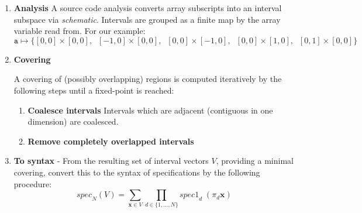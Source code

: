 \documentclass[acmlarge,review]{acmart}
\newcommand{\vect}[1]{\textbf{#1}}
\theoremstyle{definition}
\theoremstyle{plain}
\theoremstyle{remark}
\begin{document}
\begin{enumerate}[leftmargin=1.5em]
\item \textbf{Analysis} A source code analysis converts array subscripts into
  an interval subspace via \textit{schematic}. Intervals are grouped as a
  finite map by the array variable read from. For our example:
%
\begin{equation*}
\texttt{a} \mapsto \{[0,0]\times[0,0], \;\; [-1,0]\times[0,0], \;\;
[0,0]\times[-1,0], \;\; [0,0]\times[1,0], \;\; [0,1]\times[0,0]\}
\end{equation*}
%

\item \textbf{Covering}

A covering of (possibly overlapping) regions is computed iteratively
by the following steps until a fixed-point is reached:

\begin{enumerate}

\item \textbf{Coalesce intervals}
Intervals which are adjacent (contiguous in one dimension) are
coalesced.

%

\item \textbf{Remove completely overlapped intervals}



\end{enumerate}

\item \textbf{To syntax} - From the resulting set of interval vectors $V$,
providing a minimal covering, convert this to the syntax of
specifications by the following procedure:
%
\begin{equation*}
\textit{spec}_N(V) = \sum_{\textbf{x} \in V} \prod_{d \in \{1,\ldots,N\}}
\textit{spec1}_d \; (\pi_d \textbf{x})
\end{equation*}


\end{enumerate}
\end{document}
